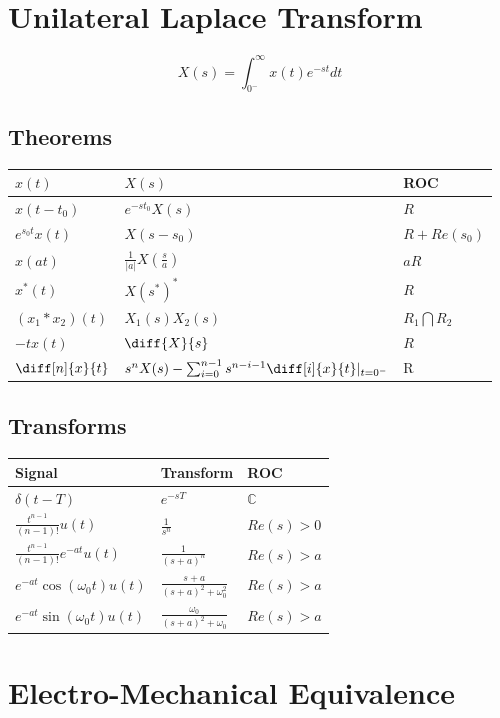 

\section*{Unilateral Laplace Transform}
$$X(s) = \int_{0^-}^\infty{x(t)e^{-st}dt}$$
\subsection*{Theorems}
\begin{center}
    \begin{tabularx}{\textwidth}{XXX}
        \hline
	$x(t)$ & $X(s)$ & ROC\\
        \hline
	$x(t-t_0)$ & $e^{-st_0}X(s)$ & $R$\\
	$e^{s_0t}x(t)$ & $X(s-s_0)$ & $R + Re(s_0)$\\
	$x(at)$ & $\frac{1}{|a|}X\left( \frac{s}{a} \right)$ & $aR$\\
	$x^*(t)$ & $X(s^*)^*$ & $R$\\
      $(x_1*x_2)(t)$ & $X_1(s)X_2(s)$ & $R_1\bigcap R_2$\\
      $-tx(t)$ & $\diff{X}{s}$ & $R$\\
      $\diff[n]{x}{t}$ & $s^nX(s)-\sum_{i=0}^{n-1}s^{n-i-1}\diff[i]{x}{t}|_{t=0^-}$ & R
    \end{tabularx}
\end{center}
\subsection*{Transforms}
\begin{center}
    \begin{tabularx}{\textwidth}{XXX}
        \hline
        Signal & Transform & ROC\\
        \hline
	$\delta(t-T)$ & $e^{-sT}$ & $\mathbb{C}$\\
	$\frac{t^{n-1}}{(n-1)!}u(t)$ & $\frac{1}{s^n}$ & $Re(s)>0$\\
	$\frac{t^{n-1}}{(n-1)!}e^{-at}u(t)$ & $\frac{1}{(s+a)^n}$ & $Re(s) > a$\\
	$e^{-at}\cos(\omega_0t)u(t)$ & $\frac{s+a}{(s+a)^2+\omega_0^2}$ & $Re(s) > a$\\
	$e^{-at}\sin(\omega_0t)u(t)$ & $\frac{\omega_0}{(s+a)^2+\omega_0}$ & $Re(s) > a$
    \end{tabularx}
\end{center}
\clearpage
\section*{Electro-Mechanical Equivalence}
